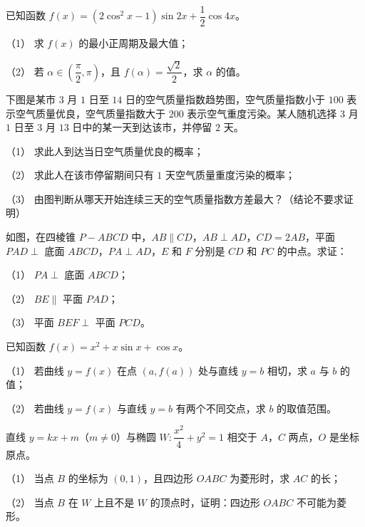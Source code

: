 \begin{question}
已知函数 $f(x)=(2\cos^2x-1)\sin2x+\dfrac12\cos4x$。

（1） 求 $f(x)$ 的最小正周期及最大值；

（2） 若 $\alpha\in\left(\dfrac{\pi}2,\pi\right)$，且 $f(\alpha)=\dfrac{\sqrt2}2$，求 $\alpha$ 的值。

\Needspace{0.4\textheight}
\end{question}
\begin{question}
下图是某市 $3$ 月 $1$ 日至 $14$ 日的空气质量指数趋势图，空气质量指数小于 $100$ 表示空气质量优良，空气质量指数大于 $200$ 表示空气重度污染。某人随机选择 $3$ 月 $1$ 日至 $3$ 月 $13$ 日中的某一天到达该市，并停留 $2$ 天。
\nopagebreak[4]
\begin{center}\end{center}
\nopagebreak[4]
（1） 求此人到达当日空气质量优良的概率；

（2） 求此人在该市停留期间只有 $1$ 天空气质量重度污染的概率；

（3） 由图判断从哪天开始连续三天的空气质量指数方差最大？（结论不要求证明）

\Needspace{0.4\textheight}
\end{question}
\begin{question}
如图，在四棱锥 $P-ABCD$ 中，$AB\parallel CD$，$AB\perp AD$，$CD=2AB$，平面 $PAD\perp$ 底面 $ABCD$，$PA\perp AD$，$E$ 和 $F$ 分别是 $CD$ 和 $PC$ 的中点。求证：

（1） $PA\perp$ 底面 $ABCD$；

（2） $BE\parallel$ 平面 $PAD$；

（3） 平面 $BEF\perp$ 平面 $PCD$。
\nopagebreak[4]
\begin{center}\end{center}
\nopagebreak[4]
\end{question}
\begin{question}
已知函数 $f(x)=x^2+x\sin x+\cos x$。

（1） 若曲线 $y=f(x)$ 在点 $(a,f(a))$ 处与直线 $y=b$ 相切，求 $a$ 与 $b$ 的值；

（2） 若曲线 $y=f(x)$ 与直线 $y=b$ 有两个不同交点，求 $b$ 的取值范围。

\end{question}
\begin{question}
直线 $y=kx+m$（$m\neq0$）与椭圆 $W:\dfrac{x^2}4+y^2=1$ 相交于 $A$，$C$ 两点，$O$ 是坐标原点。

（1） 当点 $B$ 的坐标为 $(0,1)$，且四边形 $OABC$ 为菱形时，求 $AC$ 的长；

（2） 当点 $B$ 在 $W$ 上且不是 $W$ 的顶点时，证明：四边形 $OABC$ 不可能为菱形。

\end{question}

